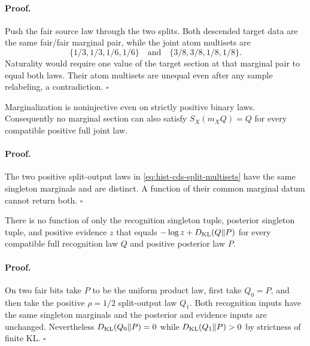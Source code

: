 \paragraph{Proof.}
Push the fair source law through the two splits.  Both descended target data
are the same fair/fair marginal pair, while the joint atom multisets are
\begin{equation}
\{1/3,1/3,1/6,1/6\}
\quad\text{and}\quad
\{3/8,3/8,1/8,1/8\}.
\label{eq:hist-cds-split-multisets}
\end{equation}
Naturality would require one value of the target section at that marginal
pair to equal both laws.  Their atom multisets are unequal even after any
sample relabeling, a contradiction.  \(\square\)

Marginalization is noninjective even on strictly positive binary laws.
Consequently no marginal section can also satisfy
\(S_X(m_XQ)=Q\) for every compatible positive full joint law.  

\paragraph{Proof.}
The two positive split-output laws in
\eqref{eq:hist-cds-split-multisets} have the same singleton marginals and are
distinct.  A function of their common marginal datum cannot return both.
\(\square\)

There is no function of only the recognition singleton tuple, posterior
singleton tuple, and positive evidence \(z\) that equals
\(-\log z+D_{\mathrm{KL}}(Q\Vert P)\) for every compatible full recognition law \(Q\)
and positive posterior law \(P\).  

\paragraph{Proof.}
On two fair bits take \(P\) to be the uniform product law, first take
\(Q_0=P\), and then take the positive \(\rho=1/2\) split-output law \(Q_1\).
Both recognition inputs have the same singleton marginals and the posterior
and evidence inputs are unchanged.  Nevertheless
\(D_{\mathrm{KL}}(Q_0\Vert P)=0\) while \(D_{\mathrm{KL}}(Q_1\Vert P)>0\) by strictness of finite KL.
\(\square\)

